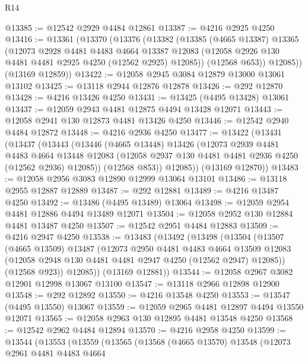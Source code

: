 \begin{lexlean}{R14}
\begin{coremodule}
@13385 := @12542 @2929 @4484 @12861
@13387 := @4216 @2925 @4250
@13416 := @13361
    (@13370
      (@13376
        (@13382
          (@13385
            (@4665 @13387)
            @13365
            (@12073
              @2928
              @4481
              @4483
              @4664
              @13387
              @12083
              (@12058 @2926 @130 @4481 @4481 @2925 @4250 (@12562 @2925) @12085))
            (@12568 @653))
          @12085))
      (@13169 @12859))
@13422 := @12058 @2945 @3084 @12879 @13000 @13061 @13102
@13425 := @13118 @2944 @12876 @12878
@13426 := @292 @12870
@13428 := @4216 @13426 @4250
@13431 := @13425 (@4495 @13428) @13061
@13437 := @12059 @2943 @4481 @12875 @4494 @13428 @12071
@13443 := @12058 @2941 @130 @12873 @4481 @13426 @4250
@13446 := @12542 @2940 @4484 @12872
@13448 := @4216 @2936 @4250
@13477 := @13422
    (@13431
      (@13437
        (@13443
          (@13446
            (@4665 @13448)
            @13426
            (@12073
              @2939
              @4481
              @4483
              @4664
              @13448
              @12083
              (@12058 @2937 @130 @4481 @4481 @2936 @4250 (@12562 @2936) @12085))
            (@12568 @853))
          @12085))
      (@13169 @12870))
@13483 := @12058 @2956 @3083 @12890 @12999 @13064 @13101
@13486 := @13118 @2955 @12887 @12889
@13487 := @292 @12881
@13489 := @4216 @13487 @4250
@13492 := @13486 (@4495 @13489) @13064
@13498 := @12059 @2954 @4481 @12886 @4494 @13489 @12071
@13504 := @12058 @2952 @130 @12884 @4481 @13487 @4250
@13507 := @12542 @2951 @4484 @12883
@13509 := @4216 @2947 @4250
@13538 := @13483
    (@13492
      (@13498
        (@13504
          (@13507
            (@4665 @13509)
            @13487
            (@12073
              @2950
              @4481
              @4483
              @4664
              @13509
              @12083
              (@12058 @2948 @130 @4481 @4481 @2947 @4250 (@12562 @2947) @12085))
            (@12568 @923))
          @12085))
      (@13169 @12881))
@13544 := @12058 @2967 @3082 @12901 @12998 @13067 @13100
@13547 := @13118 @2966 @12898 @12900
@13548 := @292 @12892
@13550 := @4216 @13548 @4250
@13553 := @13547 (@4495 @13550) @13067
@13559 := @12059 @2965 @4481 @12897 @4494 @13550 @12071
@13565 := @12058 @2963 @130 @12895 @4481 @13548 @4250
@13568 := @12542 @2962 @4484 @12894
@13570 := @4216 @2958 @4250
@13599 := @13544
    (@13553
      (@13559
        (@13565
          (@13568
            (@4665 @13570)
            @13548
            (@12073
              @2961
              @4481
              @4483
              @4664

\end{coremodule}
\end{lexlean}
